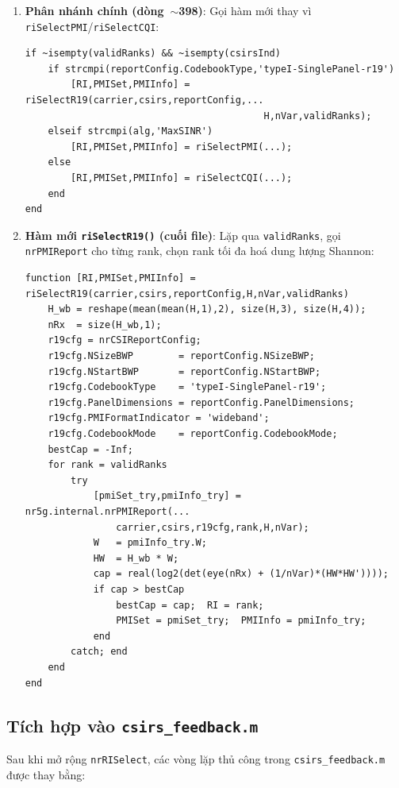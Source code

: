 \documentclass[11pt,a4paper]{article}
\begin{document}
\begin{enumerate}
\item \textbf{Phân nhánh chính (dòng~$\sim$398)}: Gọi hàm mới thay vì
\texttt{riSelectPMI}/\texttt{riSelectCQI}:
\begin{lstlisting}[style=matlab]
if ~isempty(validRanks) && ~isempty(csirsInd)
    if strcmpi(reportConfig.CodebookType,'typeI-SinglePanel-r19')
        [RI,PMISet,PMIInfo] = riSelectR19(carrier,csirs,reportConfig,...
                                          H,nVar,validRanks);
    elseif strcmpi(alg,'MaxSINR')
        [RI,PMISet,PMIInfo] = riSelectPMI(...);
    else
        [RI,PMISet,PMIInfo] = riSelectCQI(...);
    end
end
\end{lstlisting}

\item \textbf{Hàm mới \texttt{riSelectR19()} (cuối file)}: Lặp qua
\texttt{validRanks}, gọi \texttt{nrPMIReport} cho từng rank, chọn rank tối đa
hoá dung lượng Shannon:
\begin{lstlisting}[style=matlab]
function [RI,PMISet,PMIInfo] = riSelectR19(carrier,csirs,reportConfig,H,nVar,validRanks)
    H_wb = reshape(mean(mean(H,1),2), size(H,3), size(H,4));
    nRx  = size(H_wb,1);
    r19cfg = nrCSIReportConfig;
    r19cfg.NSizeBWP        = reportConfig.NSizeBWP;
    r19cfg.NStartBWP       = reportConfig.NStartBWP;
    r19cfg.CodebookType    = 'typeI-SinglePanel-r19';
    r19cfg.PanelDimensions = reportConfig.PanelDimensions;
    r19cfg.PMIFormatIndicator = 'wideband';
    r19cfg.CodebookMode    = reportConfig.CodebookMode;
    bestCap = -Inf;
    for rank = validRanks
        try
            [pmiSet_try,pmiInfo_try] = nr5g.internal.nrPMIReport(...
                carrier,csirs,r19cfg,rank,H,nVar);
            W   = pmiInfo_try.W;
            HW  = H_wb * W;
            cap = real(log2(det(eye(nRx) + (1/nVar)*(HW*HW'))));
            if cap > bestCap
                bestCap = cap;  RI = rank;
                PMISet = pmiSet_try;  PMIInfo = pmiInfo_try;
            end
        catch; end
    end
end
\end{lstlisting}

\end{enumerate}

\subsection{Tích hợp vào \texttt{csirs\_feedback.m}}

Sau khi mở rộng \texttt{nrRISelect}, các vòng lặp thủ công trong
\texttt{csirs\_feedback.m} được thay bằng:
\end{document}
